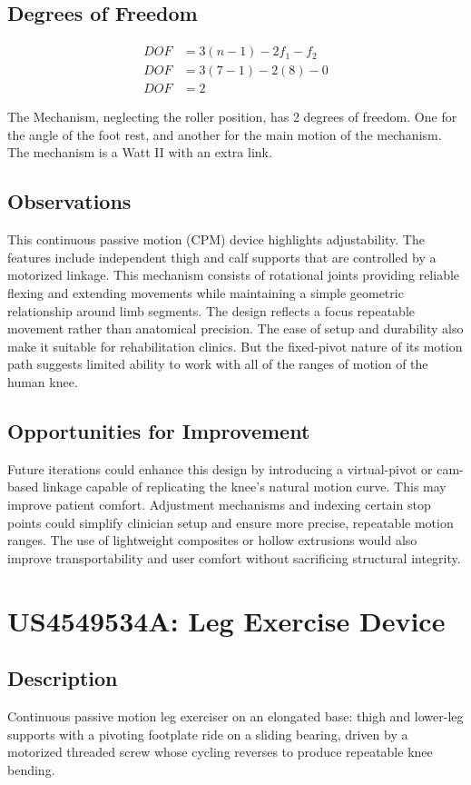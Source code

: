 \documentclass[11pt]{article}
\begin{document}
\subsection{Degrees of Freedom}
\[
\begin{aligned}
DOF &= 3(n-1) - 2f_1 - f_2 \\
DOF &= 3(7-1) - 2(8) - 0 \\
DOF &= 2
\end{aligned}
\]

The Mechanism, neglecting the roller position, has 2 degrees of freedom. One for the angle of the foot rest, and another for the main motion of the mechanism. The mechanism is a Watt II with an extra link.

\subsection{Observations}
This continuous passive motion (CPM) device highlights adjustability. The features include independent thigh and calf supports that are controlled by a motorized linkage. This mechanism consists of rotational joints providing reliable flexing and extending movements while maintaining a simple geometric relationship around limb segments. The design reflects a focus repeatable movement rather than anatomical precision. The ease of setup and durability also make it suitable for rehabilitation clinics. But the fixed-pivot nature of its motion path suggests limited ability to work with all of the ranges of motion of the human knee.

\subsection{Opportunities for Improvement}
Future iterations could enhance this design by introducing a virtual-pivot or cam-based linkage capable of replicating the knee's natural motion curve. This may improve patient comfort. Adjustment mechanisms and indexing certain stop points could simplify clinician setup and ensure more precise, repeatable motion ranges. The use of lightweight composites or hollow extrusions would also improve transportability and user comfort without sacrificing structural integrity.

\section{US4549534A: Leg Exercise Device}
\subsection{Description}
Continuous passive motion leg exerciser on an elongated base: thigh and lower-leg supports with a pivoting footplate ride on a sliding bearing, driven by a motorized threaded screw whose cycling reverses to produce repeatable knee bending.
\end{document}
